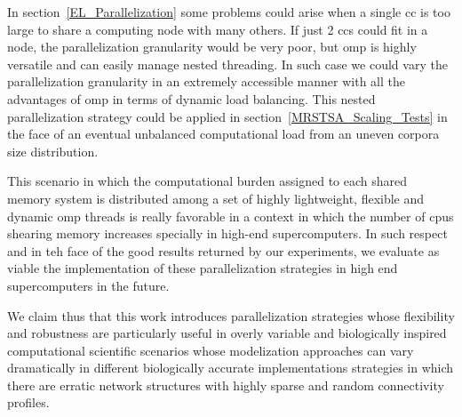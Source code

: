 \documentclass[10pt,journal,compsoc]{IEEEtran}
\begin{document}
In section~\ref{EL_Parallelization} some problems could arise when a single \gls{cc} is too large to share a computing node with many others. If just 2 \glspl{cc} could fit in a node, the parallelization granularity would be very poor, but \gls{omp} is highly versatile and can easily manage nested threading. In such case we could vary the parallelization granularity in an extremely accessible manner with all the advantages of \gls{omp} in terms of dynamic load balancing. This nested parallelization strategy could be applied in section~\ref{MRSTSA_Scaling_Tests} in the face of an eventual unbalanced computational load from an uneven corpora size distribution. 

This scenario in which the computational burden assigned to each shared memory system is distributed among a set of highly lightweight, flexible and dynamic \gls{omp} threads is really favorable in a context in which the number of \glspl{cpu} shearing memory increases specially in high-end supercomputers. In such respect and in teh face of the good results returned by our experiments, we evaluate as viable the implementation of these parallelization strategies in high end supercomputers in the future.

We claim thus that this work introduces parallelization strategies whose flexibility and robustness are particularly useful in overly variable and biologically inspired computational scientific scenarios whose modelization approaches can vary dramatically in different biologically accurate implementations strategies in which there are erratic network structures with highly sparse and random connectivity profiles.













%
%
\end{document}
